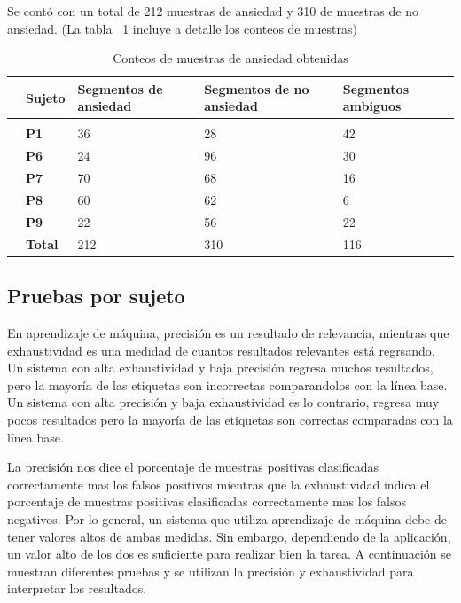 Se cont\'o con un total de 212 muestras de ansiedad y 310 de muestras de no ansiedad. (La tabla ~\ref{tab:anxietycounts} incluye a detalle los conteos de muestras)
\begin{table}[h!]
        \footnotesize
        \centering
        \caption{Conteos de muestras de ansiedad obtenidas}
\label{tab:anxietycounts}
        \begin{tabular}{m{.2cm}m{2.5cm}m{2.5cm}m{2.5cm}m{2.5cm}}
                \hline\noalign{\smallskip}
    &\textbf{Sujeto}&\textbf{Segmentos de ansiedad}&\textbf{Segmentos de no ansiedad}&\textbf{Segmentos ambiguos}\\
        \hline
 \\\noalign{\smallskip}
                &\textbf{P1}&36&28&42\\
                &\textbf{P6}&24&96&30\\
                &\textbf{P7}&70&68&16\\
                &\textbf{P8}&60&62&6\\
                &\textbf{P9}&22&56&22\\
                &\textbf{Total}&212&310&116
    \end{tabular}
\end{table}
\subsection{Pruebas por sujeto}
En aprendizaje de m\'aquina, precisi\'on es un resultado de relevancia, mientras que exhaustividad es una medidad de cuantos resultados relevantes est\'a regrsando. Un sistema con alta exhaustividad y baja precisi\'on regresa muchos resultados, pero la mayor\'ia de las etiquetas son incorrectas comparandolos con la l\'inea base. Un sistema con alta precisi\'on y baja exhaustividad es lo contrario, regresa muy pocos resultados pero la mayor\'ia de las etiquetas son correctas comparadas con la l\'inea base.

 La precisi\'on nos dice el porcentaje de muestras positivas clasificadas correctamente mas los falsos positivos mientras que la exhaustividad indica el porcentaje de muestras positivas clasificadas correctamente mas los falsos negativos. Por lo general, un sistema que utiliza aprendizaje de m\'aquina debe de tener valores altos de ambas medidas. Sin embargo, dependiendo de la aplicaci\'on, un valor alto de los dos es suficiente para realizar bien la tarea. A continuaci\'on se muestran diferentes pruebas y se utilizan la precisi\'on y exhaustividad para interpretar los resultados.

